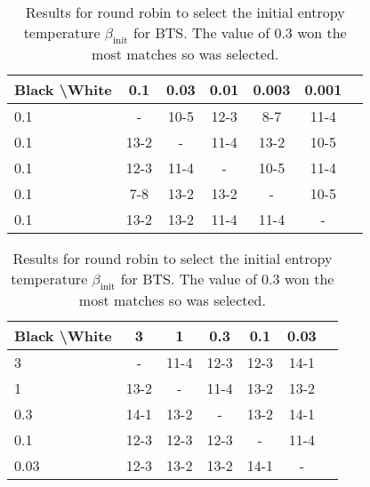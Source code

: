 \documentclass{article}
\theoremstyle{plain}
\begin{document}
\begin{appendices}
            
            \begin{table*}[]
            \centering
                \begin{tabular}{l|cccccc}
                    \textbf{Black \textbackslash White}     & 0.1  & 0.03   & 0.01   & 0.003    & 0.001    \\ 
                    \hline
                                            0.1            & - & 10-5 & 12-3 & 8-7 & 11-4  		\\
                                            0.1            & 13-2 & - & 11-4 & 13-2  & 10-5   		\\
                                            0.1            & 12-3 & 11-4 & - & 10-5 & 11-4  		\\
                                            0.1            & 7-8 & 13-2 & 13-2 & - & 10-5  		\\
                                            0.1            & 13-2 & 13-2 & 11-4 & 11-4 &  - 		\\
                \end{tabular}
                \caption{Results for round robin to select the initial entropy temperature $\beta_{\text{init}}$ for BTS. The value of 0.3 won the most matches so was selected. \label{tab:w070}}
            \end{table*}
            
            \begin{table*}[]
            \centering
                \begin{tabular}{l|cccccc}
                    \textbf{Black \textbackslash White}     & 3  & 1   & 0.3   & 0.1    & 0.03    \\ 
                    \hline
                                            3            & - & 11-4 & 12-3 & 12-3 & 14-1  		\\
                                            1            & 13-2 & - & 11-4 & 13-2 & 13-2  		\\
                                            0.3            & 14-1 & 13-2 & - & 13-2 & 14-1  		\\
                                            0.1            & 12-3 & 12-3 & 12-3 & - & 11-4  		\\
                                            0.03            & 12-3 & 13-2 & 13-2 & 14-1 &  - 		\\
                \end{tabular}
                \caption{Results for round robin to select the initial entropy temperature $\beta_{\text{init}}$ for BTS. The value of 0.3 won the most matches so was selected. \label{tab:x070}}
            \end{table*}
            

\end{appendices}
\end{document}
